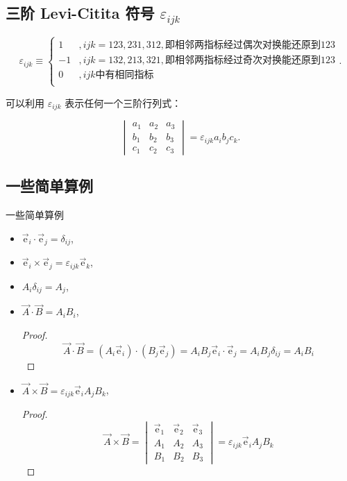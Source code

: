 \subsection{\texorpdfstring{三阶 Levi-Citita 符号 $\varepsilon_{ijk} $}{三阶 Levi-Citita 符号 }}

\begin{equation}
\varepsilon_{ijk}
\equiv\begin{cases}
1&,ijk=123,231,312,\text{即相邻两指标经过偶次对换能还原到}123 \\
-1&,ijk=132,213,321,\text{即相邻两指标经过奇次对换能还原到}123 \\
0&,ijk\text{中有相同指标} \\
\end{cases}.
\end{equation}

可以利用 $\varepsilon_{ijk} $ 表示任何一个三阶行列式：

\begin{equation}
\begin{vmatrix}
a_1 &a_2 &a_3 \\
b_1 &b_2 &b_3 \\
c_1 &c_2 &c_3
\end{vmatrix}
=\varepsilon_{ijk} a_i b_j c_k.
\end{equation}

\subsection{一些简单算例}

\begin{example}
一些简单算例
\begin{itemize}
\item $\vec{\mathrm{e}}_i\cdot\vec{\mathrm{e}}_j=\delta_{ij} $,
\item $\vec{\mathrm{e}}_i\times\vec{\mathrm{e}}_j=\varepsilon_{ijk}\vec{\mathrm{e}}_k $,
\item $A_{i}\delta_{ij}=A_j $,
\item $\vec{A}\cdot\vec{B}=A_i B_i $,
\begin{proof}
\begin{equation}
\vec{A}\cdot\vec{B}
=(A_i\vec{\mathrm{e}}_i)\cdot (B_j\vec{\mathrm{e}}_j)
=A_i B_j\vec{\mathrm{e}}_i\cdot \vec{\mathrm{e}}_j
=A_i B_j \delta_{ij}
=A_i B_i
\end{equation}
\end{proof}

\item $\vec{A}\times\vec{B}=\varepsilon_{ijk}\vec{\mathrm{e}}_i A_j B_k $,
\begin{proof}
\begin{equation}
\vec{A}\times\vec{B}
=\begin{vmatrix}
\vec{\mathrm{e}}_1 &\vec{\mathrm{e}}_2 &\vec{\mathrm{e}}_3 \\
A_1 &A_2 &A_3 \\
B_1 &B_2 &B_3
\end{vmatrix}
=\varepsilon_{ijk} \vec{\mathrm{e}}_i A_j B_k
\end{equation}
\end{proof}
\end{itemize}
\end{example}

